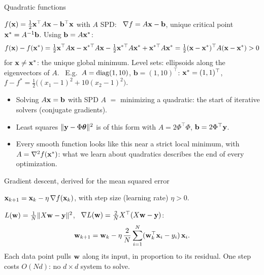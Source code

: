 \documentclass[aspectratio=1610,11pt]{beamer}
\begin{document}
\begin{frame}{Quadratic functions}
    \begin{example}
        \small $f(\mathbf{x}) = \frac{1}{2}\mathbf{x}^\top A\mathbf{x} - \mathbf{b}^\top\mathbf{x}$ with $A$ SPD: \ $\nabla f = A\mathbf{x} - \mathbf{b}$, unique critical point $\mathbf{x}^* = A^{-1}\mathbf{b}$. Using $\mathbf{b} = A\mathbf{x}^*$:
        \[f(\mathbf{x}) - f(\mathbf{x}^*) = \tfrac{1}{2}\mathbf{x}^\top A\mathbf{x} - \mathbf{x}^{*\top}A\mathbf{x} - \tfrac{1}{2}\mathbf{x}^{*\top}A\mathbf{x}^* + \mathbf{x}^{*\top}A\mathbf{x}^* = \tfrac{1}{2}(\mathbf{x} - \mathbf{x}^*)^\top A(\mathbf{x} - \mathbf{x}^*) > 0\]
        for $\mathbf{x} \neq \mathbf{x}^*$: the unique global minimum. Level sets: ellipsoids along the eigenvectors of $A$. \ E.g.\ $A = \operatorname{diag}(1, 10)$, $\mathbf{b} = (1, 10)^\top$: $\mathbf{x}^* = (1, 1)^\top$, $f - f^* = \frac{1}{2}\big((x_1 - 1)^2 + 10(x_2 - 1)^2\big)$.
    \end{example}
    \small
    \begin{itemize}
        \item Solving $A\mathbf{x} = \mathbf{b}$ with SPD $A$ $=$ minimizing a quadratic: the start of iterative solvers (conjugate gradients).
        \item Least squares $\lVert \mathbf{y} - \Phi\boldsymbol{\theta} \rVert^2$ is of this form with $A = 2\Phi^\top\Phi$, $\mathbf{b} = 2\Phi^\top\mathbf{y}$.
        \item Every smooth function looks like this near a strict local minimum, with $A = \nabla^2 f(\mathbf{x}^*)$: what we learn about quadratics describes the end of every optimization.
    \end{itemize}
\end{frame}


\begin{frame}{Gradient descent, derived for the mean squared error}
    \begin{definition}
        \small $\mathbf{x}_{k+1} = \mathbf{x}_k - \eta\,\nabla f(\mathbf{x}_k)$, with step size (learning rate) $\eta > 0$.
    \end{definition}
    \begin{example}
        \small $L(\mathbf{w}) = \frac{1}{N}\lVert X\mathbf{w} - \mathbf{y} \rVert^2$, \ $\nabla L(\mathbf{w}) = \frac{2}{N}X^\top(X\mathbf{w} - \mathbf{y})$:
        \[\mathbf{w}_{k+1} = \mathbf{w}_k - \eta\,\frac{2}{N}\sum_{i=1}^N(\mathbf{w}_k^\top\mathbf{x}_i - y_i)\,\mathbf{x}_i.\]
        Each data point pulls $\mathbf{w}$ along its input, in proportion to its residual. One step costs $O(Nd)$: no $d \times d$ system to solve.
    \end{example}
\end{frame}
\end{document}
